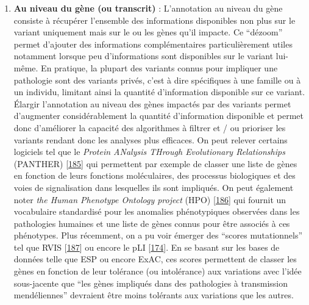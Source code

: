 \documentclass[12pt,a4paper,twoside]{ugathesis}
\providecommand{\tightlist}{%
  \setlength{\itemsep}{0pt}\setlength{\parskip}{0pt}}
\theoremstyle{definition}
\theoremstyle{definition}
\theoremstyle{definition}
\theoremstyle{remark}
\begin{document}
\newpage

\begin{enumerate}
\def\labelenumi{\arabic{enumi}.}
\setcounter{enumi}{1}
\tightlist
\item
  \textbf{Au niveau du gène (ou transcrit)} : L'annotation au niveau du
  gène consiste à récupérer l'ensemble des informations disponibles non
  plus sur le variant uniquement mais sur le ou les gènes qu'il impacte.
  Ce ``dézoom'' permet d'ajouter des informations complémentaires
  particulièrement utiles notamment lorsque peu d'informations sont
  disponibles sur le variant lui-même. En pratique, la plupart des
  variants connus pour impliquer une pathologie sont des variants
  privés, c'est à dire spécifiques à une famille ou à un individu,
  limitant ainsi la quantité d'information disponible sur ce variant.
  Élargir l'annotation au niveau des gènes impactés par des variants
  permet d'augmenter considérablement la quantité d'information
  disponible et permet donc d'améliorer la capacité des algorithmes à
  filtrer et / ou prioriser les variants rendant donc les analyses plus
  efficaces. On peut relever certains logiciels tel que le \emph{Protein
  ANalysis THrough Evolutionary Relationships} (PANTHER)
  {[}\protect\hyperlink{ref-Mi2017}{185}{]} qui permettent par exemple
  de classer une liste de gènes en fonction de leurs fonctions
  moléculaires, des processus biologiques et des voies de signalisation
  dans lesquelles ils sont impliqués. On peut également noter \emph{the
  Human Phenotype Ontology project} (HPO)
  {[}\protect\hyperlink{ref-Kohler2014}{186}{]} qui fournit un
  vocabulaire standardisé pour les anomalies phénotypiques observées
  dans les pathologies humaines et une liste de gènes connus pour être
  associés à ces phénotypes. Plus récemment, on a pu voir émerger des
  ``scores mutationnels'' tel que RVIS
  {[}\protect\hyperlink{ref-Petrovski2013}{187}{]} ou encore le pLI
  {[}\protect\hyperlink{ref-Lek2016}{174}{]}. En se basant sur les bases
  de données telle que ESP ou encore ExAC, ces scores permettent de
  classer les gènes en fonction de leur tolérance (ou intolérance) aux
  variations avec l'idée sous-jacente que ``les gènes impliqués dans des
  pathologies à transmission mendéliennes'' devraient être moins
  tolérants aux variations que les autres.
\end{enumerate}
\end{document}
